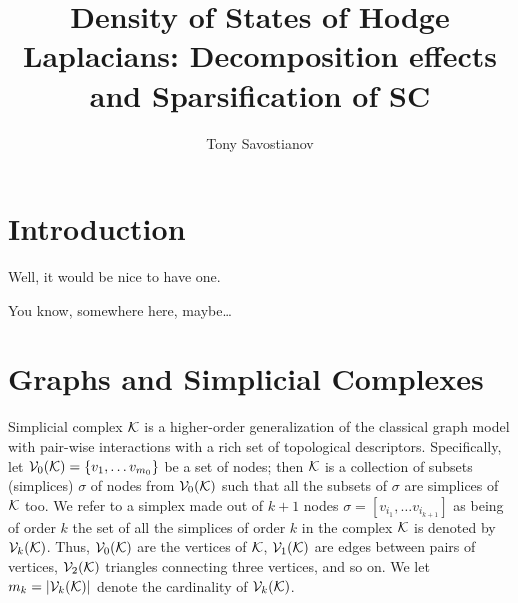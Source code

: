 \documentclass{mynotes}
\title{Density of States of Hodge Laplacians: Decomposition effects and Sparsification of SC}
\author[1]{ Tony Savostianov }
\affil[1]{ RWTH, Aachen   \\ email: \email{a.s.savostyanov@gmail.com} }
\begin{document}
\maketitle


\chapter{Introduction}

Well, it would be nice to have one. 

You know, somewhere here, maybe\dots


\chapter{ Graphs and Simplicial Complexes }

Simplicial complex \( \mathcal{K} \) is a higher-order generalization of the classical graph model with pair-wise interactions with a rich set of topological descriptors. Specifically, let \( \mathcal{V}_{0}(\mathcal{K}) = \{ v_1, \dots v_{m_0} \} \) be a set of nodes; then \( \mathcal{K} \) is a collection of subsets (simplices) \( \sigma \) of nodes from \( \mathcal{V}_{0}(\mathcal{K}) \) such that all the subsets of \( \sigma \) are simplices of \( \mathcal{K} \) too.
We refer to a simplex made out of \( k + 1 \) nodes \( \sigma = [ v_{i_1}, \ldots v_{i_{k+1}} ] \) as being of order \( k \)%
the set of all the simplices of order \( k \) in the complex \( \mathcal{K} \) is denoted by \( \mathcal{V}_{k}(\mathcal{K}) \). Thus, \( \mathcal{V}_{0}(\mathcal{K}) \) are the vertices of \( \mathcal{K} \), \( \mathcal{V}_{1}(\mathcal{K}) \) are edges between pairs of vertices, \( \mathcal{V}_{2}(\mathcal{K}) \) triangles connecting three vertices, and so on. We let \( m_k = | \mathcal{V}_{k}(\mathcal{K}) | \) denote the cardinality of \( \mathcal{V}_{k}(\mathcal{K})\).
\end{document}
